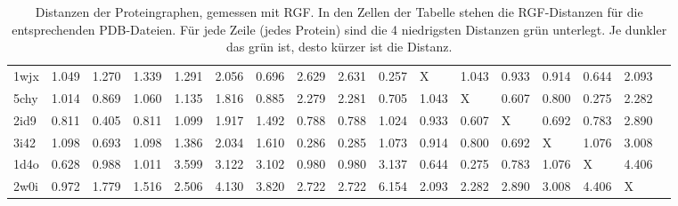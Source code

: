 \documentclass{report}
\begin{document}
\begin{table}
{\begin{tabular}{l l l l l l l l l l l l l l l l l}
1wjx & 1.049 & 1.270 & 1.339 & 1.291 & 2.056 & \cellcolor{fGreen!50}0.696 & 2.629 & 2.631 & \cellcolor{fGreen!100}0.257 &   X   & 1.043 & 0.933 & \cellcolor{fGreen!25}0.914 & \cellcolor{fGreen!75}0.644 & 2.093 &  \\
5chy & 1.014 & 0.869 & 1.060 & 1.135 & 1.816 & 0.885 & 2.279 & 2.281 & \cellcolor{fGreen!50}0.705 & 1.043 &   X   & \cellcolor{fGreen!75}0.607 & \cellcolor{fGreen!25}0.800 & \cellcolor{fGreen!100}0.275 & 2.282 &  \\
2id9 & 0.811 & \cellcolor{fGreen!100}0.405 & 0.811 & 1.099 & 1.917 & 1.492 & 0.788 & 0.788 & 1.024 & 0.933 & \cellcolor{fGreen!75}0.607 &   X   & \cellcolor{fGreen!50}0.692 & \cellcolor{fGreen!25}0.783 & 2.890 &  \\
3i42 & 1.098 & \cellcolor{fGreen!25}0.693 & 1.098 & 1.386 & 2.034 & 1.610 & \cellcolor{fGreen!75}0.286 & \cellcolor{fGreen!100}0.285 & 1.073 & 0.914 & 0.800 & \cellcolor{fGreen!50}0.692 &   X   & 1.076 & 3.008 &  \\
1d4o & \cellcolor{fGreen!75}0.628 & 0.988 & 1.011 & 3.599 & 3.122 & 3.102 & 0.980 & 0.980 & 3.137 & \cellcolor{fGreen!50}0.644 & \cellcolor{fGreen!100}0.275 & \cellcolor{fGreen!25}0.783 & 1.076 &   X   & 4.406 &  \\
2w0i & \cellcolor{fGreen!100}0.972 & \cellcolor{fGreen!50}1.779 & \cellcolor{fGreen!75}1.516 & 2.506 & 4.130 & 3.820 & 2.722 & 2.722 & 6.154 & \cellcolor{fGreen!25}2.093 & 2.282 & 2.890 & 3.008 & 4.406 &   X   &  \\


\end{tabular}}
\caption{Distanzen der Proteingraphen, gemessen mit RGF. In den Zellen der Tabelle stehen die RGF-Distanzen f\"ur die entsprechenden PDB-Dateien. F\"ur jede Zeile (jedes Protein) sind die 4 niedrigsten Distanzen gr\"un unterlegt. Je dunkler das gr\"un ist, desto k\"urzer ist die Distanz.}
\label{table:occ-pg-rgf}
\end{table}
\end{document}
